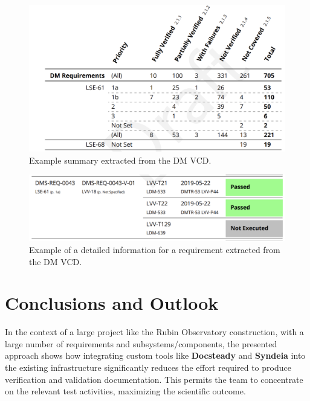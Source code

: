 \begin{figure}
\begin{center}
\includegraphics[width=\textwidth]{imgs/VCDsumm.png}
 \caption{Example summary extracted from the DM VCD.}
 \label{fig:vcdsum}
\end{center}
\end{figure}

\begin{figure}
\begin{center}
\includegraphics[width=\textwidth]{imgs/VCDdetail.png}
 \caption{Example of a detailed information for a requirement extracted from the DM VCD.}
 \label{fig:vcddetail}
\end{center}
\end{figure}
\section{Conclusions and Outlook}

In the context of a large project like the Rubin Observatory construction, with a large number of requirements
and subsystems/components, the presented approach shows how integrating custom tools like \textbf{Docsteady}
and \textbf{Syndeia} into the existing infrastructure significantly reduces the effort
required to produce verification and validation documentation.
This permits the team to concentrate on the relevant test activities, maximizing the scientific outcome.

